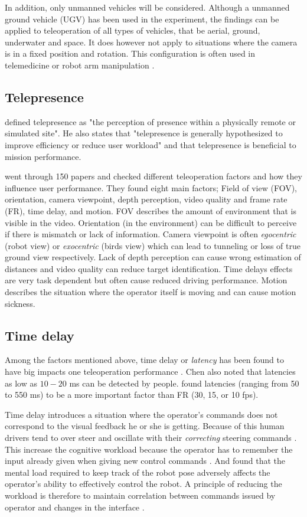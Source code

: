 In addition, only unmanned vehicles will be considered. Although a unmanned ground vehicle (UGV) has been used in the experiment, the findings can be applied to teleoperation of all types of vehicles, that be aerial, ground, underwater and space. It does however not apply to situations where the camera is in a fixed position and rotation. This configuration is often used in telemedicine \citep{Kumcu2017} or robot arm manipulation \citep{Bejczy1990}.

\subsection{Telepresence}

\citet{Draper1998} defined telepresence as "the perception of presence within a physically remote or simulated site". He also states that "telepresence is generally hypothesized to improve efficiency or reduce user workload" and that telepresence is beneficial to mission performance.

\citet{Chen2007} went through 150 papers and checked different teleoperation factors and how they influence user performance. They found eight main factors; Field of view (FOV), orientation, camera viewpoint, depth perception, video quality and frame rate (FR), time delay, and motion. FOV describes the amount of environment that is visible in the video. Orientation (in the environment) can be difficult to perceive if there is mismatch or lack of information. Camera viewpoint is often \emph{egocentric} (robot view) or \emph{exocentric} (birds view) which can lead to tunneling or loss of true ground view respectively. Lack of depth perception can cause wrong estimation of distances and video quality can reduce target identification. Time delays effects are very task dependent but often cause reduced driving performance. Motion describes the situation where the operator itself is moving and can cause motion sickness.


\subsection{Time delay}
Among the factors mentioned above, time delay or \emph{latency} has been found to have big impacts one teleoperation performance \citep{Chen2007}. Chen also noted that latencies as low as $10-20$ ms can be detected by people. \citep{Arthur1993} found latencies (ranging from 50 to 550 ms) to be a more important factor than FR (30, 15, or 10 fps). 

Time delay introduces a situation where the operator's commands does not correspond to the visual feedback he or she is getting. Because of this human drivers tend to over steer and oscillate with their \emph{correcting} steering commands \citep{Appelqvist2007}. This increase the cognitive workload because the operator has to remember the input already given when giving new control commands \citep{Matheson2013}. And \citep{Ricks2004} found that the mental load required to keep track of the robot pose adversely affects the operator's ability to effectively control the robot. A principle of reducing the workload is therefore to maintain correlation between commands issued by operator and changes in the interface \citep{Nielsen2007}. 

